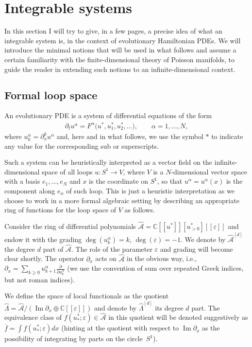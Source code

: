 \documentclass[pdftex]{sigma}
\numberwithin{equation}{section}
\newcommand{\mbC}{\mathbb C}
\newcommand{\hLambda}{\widehat\Lambda}
\renewcommand{\Im}{\operatorname{Im}}
\def\d{{\partial}}
\newcommand{\<}{\left<}
\renewcommand{\>}{\right>}
\newcommand{\eps}{\varepsilon}
\newcommand{\hcA}{\widehat{\mathcal A}}
\begin{document}
\section{Integrable systems}

In this section I will try to give, in a few pages, a precise idea of what an integrable system is, in the context of evolutionary Hamiltonian PDEs. We will introduce the minimal notions that will be used in what follows and assume a certain familiarity with the f\/inite-dimensional theory of Poisson manifolds, to guide the reader in extending such notions to an inf\/inite-dimensional context.

\subsection{Formal loop space} An evolutionary PDE is a system of dif\/ferential equations of the form
\begin{gather*}\d_t u^\alpha = F^\alpha\big(u^*,u^*_1,u^*_2,\dots\big), \qquad \alpha=1,\dots,N,\end{gather*}
where $u^\alpha_k = \d_x^k u^\alpha$ and, here and in what follows, we use the symbol $*$ to indicate any value for the corresponding sub or superscripts.

Such a system can be heuristically interpreted as a vector f\/ield on the inf\/inite-dimensional space of all loops $u\colon S^1\to V$, where $V$ is a $N$-dimensional vector space with a basis $e_1,\dots,e_N$ and $x$ is the coordinate on $S^1$, so that $u^\alpha=u^\alpha(x)$ is the component along $e_\alpha$ of such loop. This is just a heuristic interpretation as we choose to work in a more formal algebraic setting by describing an appropriate ring of functions for the loop space of $V$ as follows.

Consider the ring of dif\/ferential polynomials $\hcA = \mbC[[u^*]][u^*_{>0}][[\eps]]$ and endow it with the grading $\deg(u^\alpha_k) = k$, $\deg(\eps)=-1$. We denote by $\hcA^{[d]}$ the degree $d$ part of $\hcA$. The role of the parameter $\eps$ and grading will become clear shortly. The operator $\d_x$ acts on $\hcA$ in the obvious way, i.e., $\d_x=\sum\limits_{k \geq 0} u^\alpha_{k+1} \frac{\d}{\d u^\alpha_k}$ (we use the convention of sum over repeated Greek indices, but not roman indices).

We def\/ine the space of local functionals as the quotient $\hLambda = \hcA /( \Im \d_x \oplus \mbC[[\eps]])$ and denote by $\hLambda^{[d]}$ its degree $d$ part. The equivalence class of $f(u^*_*;\eps)\in \hcA$ in this quotient will be denoted suggestively as $\overline{f} = \int f(u^*_*;\eps) dx$ (hinting at the quotient with respect to $\Im \d_x$ as the possibility of integrating by parts on the circle~$S^1$).
\end{document}
